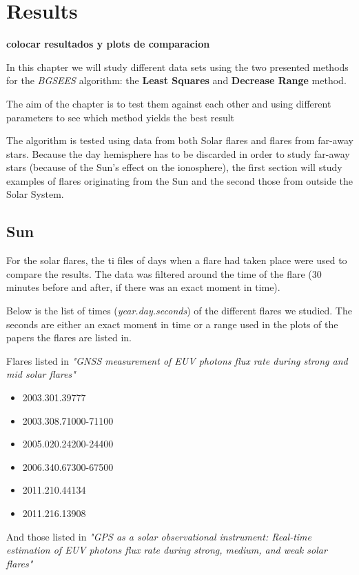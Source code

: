 \chapter{Results}

\textbf{colocar resultados y plots de comparacion}

In this chapter we will study different data sets using the two presented methods for the \textit{BGSEES} algorithm: the \textbf{Least Squares} and \textbf{Decrease Range} method. 

The aim of the chapter is to test them against each other and using different parameters to see which method yields the best result

The algorithm is tested using data from both Solar flares and flares from far-away stars. Because the day hemisphere has to be discarded in order to study far-away stars (because of the Sun's effect on the ionosphere), the first section will study examples of flares originating from the Sun and the second those from outside the Solar System.

\section{Sun}

For the solar flares, the ti files of days when a flare had taken place were used to compare the results. The data was filtered around the time of the flare (30 minutes before and after, if there was an exact moment in time).
 
Below is the list of times (\textit{year.day.seconds}) of the different flares we studied. The seconds are either an exact moment in time or a range used in the plots of the papers the flares are listed in.

Flares listed in \textit{"GNSS measurement of EUV photons flux rate during strong and mid solar flares"}\cite{hernandez2012gnss}

\begin{itemize}
	\item 2003.301.39777
	\item 2003.308.71000-71100
	\item 2005.020.24200-24400
	\item 2006.340.67300-67500
	\item 2011.210.44134
	\item 2011.216.13908
\end{itemize}

And those listed in \textit{"GPS as a solar observational instrument: Real-time estimation of EUV photons flux rate during strong, medium, and weak solar flares"}\cite{singh2015gps}

